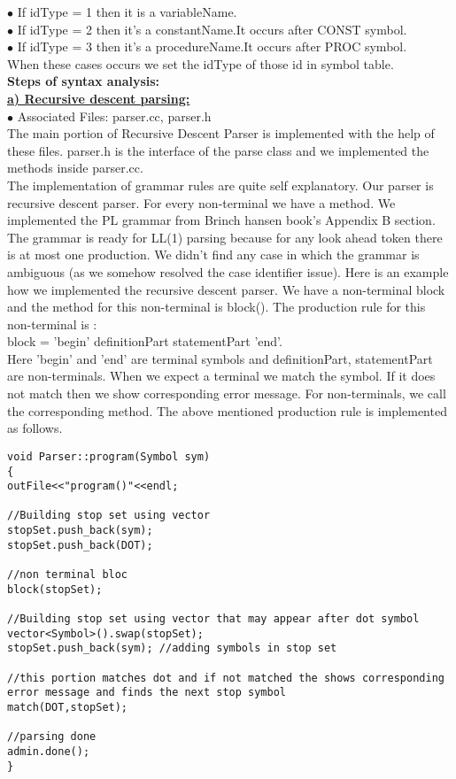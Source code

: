 \documentclass[paper=letter, fontsize=12pt]{scrartcl} %
\begin{document}
$\bullet$ If idType = 1 then it is a variableName.\\ 
$\bullet$ If idType = 2	then it's a constantName.It occurs after CONST symbol.\\
$\bullet$ If idType = 3 then it's a procedureName.It occurs after PROC symbol. \\ 

When these cases occurs we set the idType of those id in symbol table.\\

\pagebreak
{\bf Steps of syntax analysis:}\\

\underline {\bf a) Recursive descent parsing:}\\

$\bullet$ Associated Files: parser.cc, parser.h\\ 

The main portion of Recursive Descent Parser is implemented with the help of these files. parser.h is the interface of the parse class and we implemented the methods inside parser.cc.\\

The implementation of grammar rules are quite self explanatory. Our parser is recursive descent parser. For every non-terminal we have a method. We implemented the PL grammar from Brinch hansen book's Appendix B section. The grammar is ready for LL(1) parsing because for any look ahead token there is at most one production. We didn't find any case in which the grammar is ambiguous (as we somehow resolved the case identifier issue). Here is an example how we implemented the recursive descent parser. We have a non-terminal block and the method for this non-terminal is block(). The production rule for this non-terminal is :\\

block = 'begin' definitionPart statementPart 'end'.\\

Here 'begin' and 'end' are terminal symbols and definitionPart, statementPart are non-terminals. When we expect a terminal we match the symbol. If it does not match then we show corresponding error message. For non-terminals, we call the corresponding method. The above mentioned production rule is implemented as follows.

\begin{lstlisting}
void Parser::program(Symbol sym)
{
outFile<<"program()"<<endl;

//Building stop set using vector		
stopSet.push_back(sym);
stopSet.push_back(DOT);

//non terminal bloc	
block(stopSet);	

//Building stop set using vector that may appear after dot symbol
vector<Symbol>().swap(stopSet);
stopSet.push_back(sym); //adding symbols in stop set

//this portion matches dot and if not matched the shows corresponding error message and finds the next stop symbol
match(DOT,stopSet);

//parsing done
admin.done();
}

\end{lstlisting}
\end{document}
